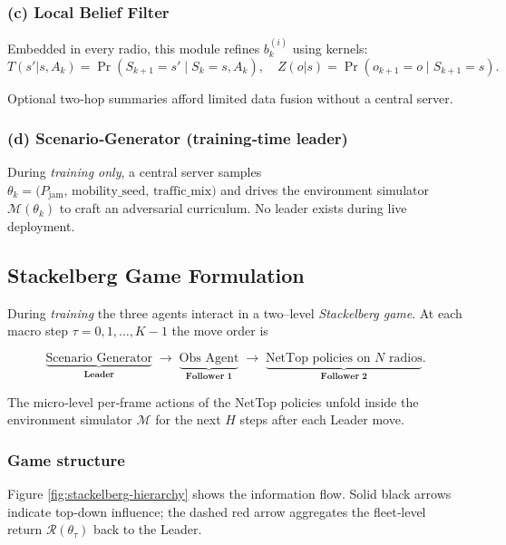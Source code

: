 \documentclass[doc.tex]{subfiles}
\begin{document}
\subsubsection*{(c) Local Belief Filter}

Embedded in every radio, this module refines \(b_k^{(i)}\) using kernels:
\[
  T(s'|s,A_k)=\Pr(S_{k+1}\!=\!s'\mid S_k\!=\!s,A_k),\quad
  Z(o|s)=\Pr(o_{k+1}\!=\!o\mid S_{k+1}\!=\!s).
\]

Optional two‑hop summaries afford limited data fusion without a central server.

\subsubsection*{(d) Scenario‑Generator (training‑time leader)}

During \emph{training only}, a central server samples
\(\theta_k=\bigl(P_{\text{jam}},\,\text{mobility\_seed},\,
                 \text{traffic\_mix}\bigr)\)
and drives the environment simulator \(\mathcal{M}(\theta_k)\) to craft
an adversarial curriculum.  No leader exists during live deployment.

\subsection{Stackelberg Game Formulation}
\label{sec:stackelberg_formulation}

During \emph{training} the three agents interact in a two–level
\emph{Stackelberg game}. At each macro step
\(\tau=0,1,\dots,K{-}1\) the move order is  

\[
  \underbrace{\text{Scenario Generator}}_{\textbf{Leader}}
  \;\longrightarrow\;
  \underbrace{\text{Obs Agent}}_{\textbf{Follower 1}}
  \;\longrightarrow\;
  \underbrace{\text{NetTop policies on }N\text{ radios}}_{\textbf{Follower 2}}.
\]

The micro‑level per‑frame actions of the NetTop policies unfold inside
the environment simulator \(\mathcal{M}\) for the next \(H\) steps
after each Leader move.

\subsubsection{Game structure}

Figure \ref{fig:stackelberg-hierarchy} shows the information flow.
Solid black arrows indicate top‑down influence; the dashed red arrow
aggregates the fleet‑level return \( \mathcal{R}(\theta_\tau) \) back to
the Leader.
\end{document}
